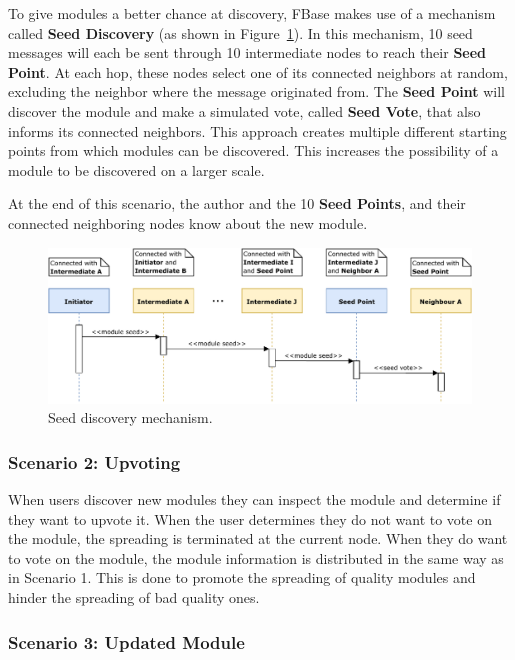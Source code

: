 To give modules a better chance at discovery, FBase makes use of a mechanism called \textbf{Seed Discovery} (as shown in Figure~\ref{fig:seed-discovery}). In this mechanism, 10 seed messages will each be sent through 10 intermediate nodes to reach their \textbf{Seed Point}. At each hop, these nodes select one of its connected neighbors at random, excluding the neighbor where the message originated from. The \textbf{Seed Point} will discover the module and make a simulated vote, called \textbf{Seed Vote}, that also informs its connected neighbors. This approach creates multiple different starting points from which modules can be discovered. This increases the possibility of a module to be discovered on a larger scale.

At the end of this scenario, the author and the 10 \textbf{Seed Points}, and their connected neighboring nodes know about the new module.

\begin{figure}[h]
	\centering
	\includegraphics[width=1\textwidth]{images/discovery-protocol-seed.pdf}
	\caption{\label{fig:seed-discovery} Seed discovery mechanism.}
\end{figure}

\newpage

\subsubsection{\textbf{Scenario 2: Upvoting}}

When users discover new modules they can inspect the module and determine if they want to upvote it. When the user determines they do not want to vote on the module, the spreading is terminated at the current node. When they do want to vote on the module, the module information is distributed in the same way as in Scenario 1. This is done to promote the spreading of quality modules and hinder the spreading of bad quality ones. 

\subsubsection{\textbf{Scenario 3: Updated Module}}

